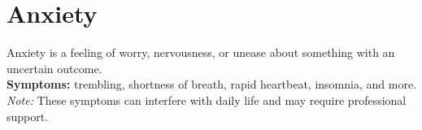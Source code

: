 \section*{Anxiety}
Anxiety is a feeling of worry, nervousness, or unease about something with an uncertain outcome.\\
\textbf{Symptoms:} trembling, shortness of breath, rapid heartbeat, insomnia, and more.\\
\textit{Note:} These symptoms can interfere with daily life and may require professional support.\\ 